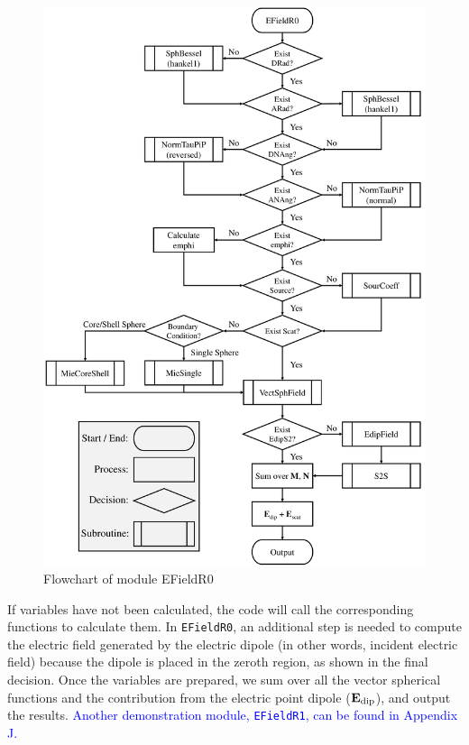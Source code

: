 \documentclass[journal=jacsat,manuscript=article,layout=traditional]{achemso}
\newcommand*\blue[1]{\textcolor{blue}{#1}}
\newcommand{\cfont}[1]{\texttt{#1}}
\begin{document}
\newpage
\begin{figure}[!h]
    \begin{center}
    \includegraphics[width=.87\textwidth]{Figures/EFieldR0.pdf}
    \caption{Flowchart of module EFieldR0}
    \label{FC:EFieldR0}
    \end{center}
\end{figure}
\newpage\noindent
If variables have not been calculated, the code will call the corresponding functions to calculate them.
In \cfont{EFieldR0}, an additional step is needed to compute the electric field generated by the electric dipole (in other words, incident electric field) because the dipole is placed in the zeroth region, as shown in the final decision.
Once the variables are prepared, we sum over all the vector spherical functions and the contribution from the electric point dipole ($\vb{E}_\mathrm{dip}$), and output the results.
\blue{Another demonstration module, \cfont{EFieldR1}, can be found in Appendix J.}

\end{document}
